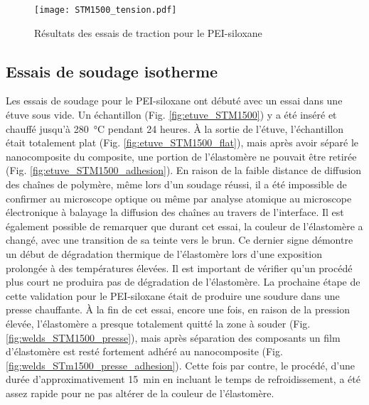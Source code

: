 \begin{figure}[h]
	\centering
	\texttt{[image: STM1500\_tension.pdf]}
	\caption{Résultats des essais de traction pour le PEI-siloxane}
	\label{fig:STM1500_tension}
\end{figure}

\FloatBarrier
\subsection{Essais de soudage isotherme}
 
Les essais de soudage pour le PEI-siloxane ont débuté avec un essai dans une étuve sous vide. 
Un échantillon (Fig. \ref{fig:etuve_STM1500}) y a été inséré et chauffé jusqu'à \SI[locale=FR]{280}{\celsius} pendant 24 heures. 
À la sortie de l'étuve, l'échantillon était totalement plat (Fig. \ref{fig:etuve_STM1500_flat}), mais après avoir séparé le nanocomposite du composite, une portion de l'élastomère ne pouvait être retirée (Fig. \ref{fig:etuve_STM1500_adhesion}). 
En raison de la faible distance de diffusion des chaînes de polymère, même lors d'un soudage réussi, il a été impossible de confirmer au microscope optique ou même par analyse atomique au microscope électronique à balayage la diffusion des chaînes au travers de l'interface. 
Il est également possible de remarquer que durant cet essai, la couleur de l'élastomère a changé, avec une transition de sa teinte vers le brun.  
Ce dernier signe démontre un début de dégradation thermique de l'élastomère lors d'une exposition prolongée à des températures élevées. 
Il est important de vérifier qu'un procédé plus court ne produira pas de dégradation de l'élastomère. 
La prochaine étape de cette validation pour le PEI-siloxane était de produire une soudure dans une presse chauffante. 
À la fin de cet essai, encore une fois, en raison de la pression élevée, l'élastomère a presque totalement quitté la zone à souder (Fig. \ref{fig:welds_STM1500_presse}), mais après séparation des composants un film d'élastomère est resté fortement adhéré au nanocomposite (Fig. \ref{fig:welds_STm1500_presse_adhesion}). 
Cette fois par contre, le procédé, d'une durée d'approximativement \SI[locale=FR]{15}{\minute} en incluant le temps de refroidissement, a été assez rapide pour ne pas altérer de la couleur de l'élastomère. 

